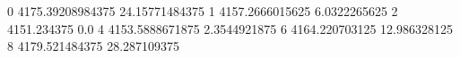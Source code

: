 0 4175.39208984375 24.15771484375
1 4157.2666015625 6.0322265625
2 4151.234375 0.0
4 4153.5888671875 2.3544921875
6 4164.220703125 12.986328125
8 4179.521484375 28.287109375
